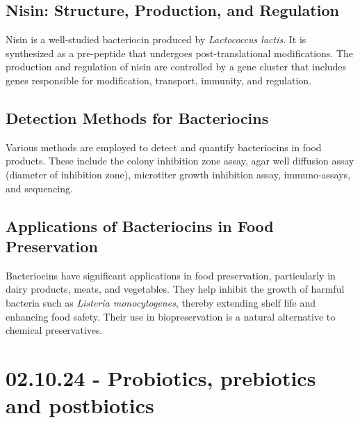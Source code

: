 \subsection{Nisin: Structure, Production, and Regulation} 
Nisin is a well-studied bacteriocin produced by \textit{Lactococcus lactis}. It is synthesized as a pre-peptide that undergoes post-translational modifications. The production and regulation of nisin are controlled by a gene cluster that includes genes responsible for modification, transport, immunity, and regulation.

\subsection{Detection Methods for Bacteriocins} 
Various methods are employed to detect and quantify bacteriocins in food products. These include the colony inhibition zone assay, agar well diffusion assay (diameter of inhibition zone), microtiter growth inhibition assay, immuno-assays, and sequencing. 

\subsection{Applications of Bacteriocins in Food Preservation} 
Bacteriocins have significant applications in food preservation, particularly in dairy products, meats, and vegetables. They help inhibit the growth of harmful bacteria such as \textit{Listeria monocytogenes}, thereby extending shelf life and enhancing food safety. Their use in biopreservation is a natural alternative to chemical preservatives.

\section{02.10.24 - Probiotics, prebiotics and postbiotics}







